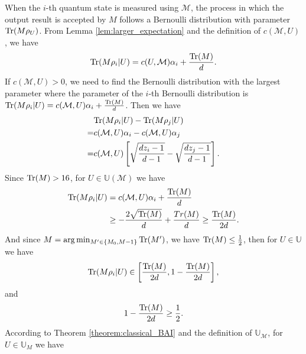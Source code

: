     When the $i$-th quantum state is measured using $\mathcal{M}$, the process in which the output result is accepted by $M$ follows a Bernoulli distribution with parameter $\mathrm{Tr}(M\rho_U)$. From Lemma \ref{lem:larger_expectation} and the definition of $c(\mathcal{M}, U)$, we have 
    \begin{equation}
        \mathrm{Tr}(M\rho_i|U) = c(U,\mathcal{M})\alpha_i + \frac{\mathrm{Tr}(M)}{d}.    
    \end{equation}
    If $c(\mathcal{M},U) >0$, we need to find the Bernoulli distribution with the largest parameter where the parameter of the $i$-th Bernoulli distribution is $\mathrm{Tr}(M\rho_i|U) = c(\mathcal{M},U)\alpha_i + \frac{\mathrm{Tr}(M)}{d}$. Then we have
    \begin{equation}
        \begin{aligned}
            & \mathrm{Tr}(M\rho_i|U) - \mathrm{Tr}(M\rho_j|U) \\
            = & c(\mathcal{M},U)\alpha_i  - c(\mathcal{M},U)\alpha_j \\
            = & c(\mathcal{M},U) \left[\sqrt {\frac{dz_i -1}{d-1}} - \sqrt{\frac{dz_j -1}{d-1}}\right].
        \end{aligned}
    \end{equation}
    Since $\mathrm{Tr}(M) > 16$, for $U \in \mathbb{U}(\mathcal{M})$ we have
    \begin{equation}
        \begin{aligned}
            \mathrm{Tr}(M\rho_i|U) & = c(\mathcal{M},U)\alpha_i + \frac{\mathrm{Tr}(M)}{d} \\
            & \geq - \frac{2\sqrt{\mathrm{Tr}(M)}}{d} + \frac{Tr(M)}{d} \geq \frac{\mathrm{Tr}(M)}{2d}.
        \end{aligned}
    \end{equation}
    And since $M = \arg\min_{M'\in \{M_0,M-1\}} \mathrm{Tr}(M')$, we have $\mathrm{Tr}(M) \leq \frac{1}{2}$, then for $U \in \mathbb{U}$ we have
    \begin{equation}
         \mathrm{Tr}(M\rho_i|U) \in \left[\frac{\mathrm{Tr}(M)}{2d}, 1-\frac{\mathrm{Tr}(M)}{2d}\right],
    \end{equation}
    and 
    \begin{equation}
        1- \frac{\mathrm{Tr}(M)}{2d} \geq \frac{1}{2}.
    \end{equation}
    According to Theorem \ref{theorem:classical_BAI} and the definition of $\mathbb{U}_\mathcal{M}$, for $U \in \mathbb{U}_M$ we have
